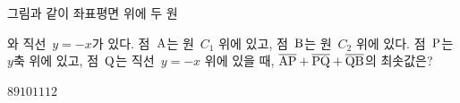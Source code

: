 그림과 같이 좌표평면 위에 두 원 \par\smallskip{}\par\smallskip{}\par\smallskip\noindent 와 직선~$y=-x$가 있다. 점~$\mathrm{A}$는 원~$C_1$ 위에 있고, 점~$\mathrm{B}$는 원~$C_2$ 위에 있다. 점~$\mathrm{P}$는 $y$축 위에 있고, 점~$\mathrm{Q}$는 직선~$y=-x$ 위에 있을 때, $\overline{\mathrm{AP}}+\overline{\mathrm{PQ}}+\overline{\mathrm{QB}}$의 최솟값은? 
\par\smallskip\begin{center}\resizebox{\ifdim\width>\linewidth\linewidth\else\width\fi}{!}{}\end{center}
\begin{choices32}{$8$}{$9$}{$10$}{$11$}{$12$}\end{choices32}
